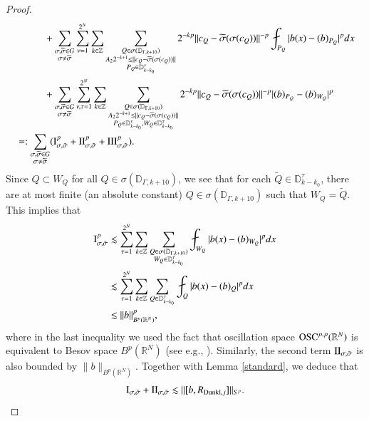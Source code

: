 \documentclass[12pt]{amsart}
\begin{document}
\begin{proof}
\begin{align*}
&\hspace{1.0cm}+\sum_{{\substack{\sigma,\widetilde{\sigma}\in G \\ \sigma\neq \widetilde{\sigma}}}}\sum_{\nu=1}^{2^N}\sum_{k\in\mathbb{Z}}\sum_{\substack{Q\in\sigma(\mathbb{D}_{\Gamma,k+10})\nonumber\\ A_22^{-k+1}\leq \|c_Q-\widetilde{\sigma}(\sigma(c_Q))\|\\ P_Q\in\mathbb{D}_{k-k_0}^\nu}}2^{-kp}\|c_Q-\widetilde{\sigma}(\sigma(c_Q))\|^{-p}\fint_{P_Q}|b(x)-(b)_{P_Q}|^pdx\nonumber\\
&\hspace{1.0cm}+\sum_{{\substack{\sigma,\widetilde{\sigma}\in G \\ \sigma\neq \widetilde{\sigma}}}}\sum_{\nu,\tau=1}^{2^N}\sum_{k\in\mathbb{Z}}\sum_{\substack{Q\in\sigma(\mathbb{D}_{\Gamma,k+10})\nonumber\\ A_22^{-k+1}\leq \|c_Q-\widetilde{\sigma}(\sigma(c_Q))\|\\ P_Q\in\mathbb{D}_{k-k_0}^\nu,W_Q\in\mathbb{D}_{k-k_0}^\tau }}2^{-kp}\|c_Q-\widetilde{\sigma}(\sigma(c_Q))\|^{-p}|(b)_{P_Q}-(b)_{W_Q}|^p\nonumber\\
&=:\sum_{{\substack{\sigma,\widetilde{\sigma}\in G \\ \sigma\neq \widetilde{\sigma}}}}({\rm I}_{\sigma,\tilde{\sigma}}^p+{\rm II}_{\sigma,\tilde{\sigma}}^p+{\rm III}_{\sigma,\tilde{\sigma}}^p).
\end{align*}
Since $Q\subset W_Q$ for all $Q\in\sigma(\mathbb{D}_{\Gamma,k+10})$, we see that for each $\widetilde{Q}\in \mathbb{D}_{k-k_0}^\tau$, there are at most finite (an absolute constant) $Q\in \sigma(\mathbb{D}_{\Gamma,k+10})$ such that $W_Q=\widetilde{Q}$. This implies that
\begin{align}
  {\rm I}_{\sigma,\tilde{\sigma}}^p
  &\lesssim \sum_{\tau=1}^{2^N}\sum_{k\in\mathbb{Z}}\sum_{\substack{Q\in\sigma(\mathbb{D}_{\Gamma,k+10})\nonumber\\ W_Q\in\mathbb{D}_{k-k_0}^\tau }}\fint_{W_Q}|b(x)-(b)_{W_Q}|^pdx\nonumber\\
    &\lesssim \sum_{\tau=1}^{2^N}\sum_{k\in\mathbb{Z}}\sum_{Q\in\mathbb{D}_{k-k_0}^\tau }\fint_{Q}|b(x)-(b)_{Q}|^pdx\nonumber\\
    &\lesssim \|b\|_{B^p(\mathbb{R}^N)}^p,
\end{align}
where in the last inequality we used the fact that oscillation space ${\rm OSC}^{p,p}(\mathbb{R}^N)$ is equivalent to Besov space $B^p(\mathbb{R}^N)$ (see e.g., \cite[Proposition 17.5]{HKarxiv}). Similarly, the second term ${\rm II}_{\sigma,\tilde{\sigma}}$ is also bounded by $\|b\|_{B^p(\mathbb{R}^N)}$. Together with Lemma \ref{standard}, we deduce that
$${\rm I}_{\sigma,\tilde{\sigma}}+{\rm II}_{\sigma,\tilde{\sigma}}\lesssim \|[b,R_{{\rm Dunkl},j}]\|_{S^p}.$$


\end{proof}
\end{document}
